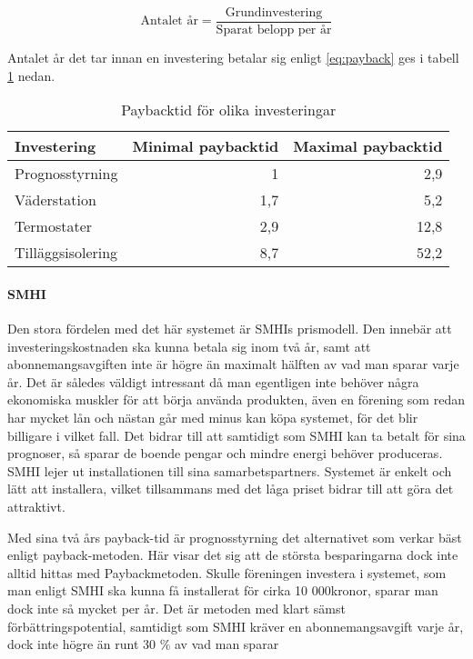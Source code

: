 \begin{equation} \label{eq:payback}
\text{Antalet år}=\frac{\text{Grundinvestering}}{\text{Sparat belopp per år}}
\end{equation}

Antalet år det tar innan en investering betalar sig enligt \eqref{eq:payback} ges i tabell \ref{tbl:payback} nedan.

\begin{table}[hbtp]
\centering
\caption{Paybacktid för olika investeringar}
\label{tbl:payback}

\begin{tabular}
{|l|r|r|}
\hline
\textbf{Investering} & \textbf{Minimal paybacktid} &{\textbf{Maximal paybacktid}} \\
\hline
Prognosstyrning &  1 & 2,9 \\ 
\hline
Väderstation & 1,7 & 5,2 \\
\hline
Termostater & 2,9 & 12,8 \\
\hline
Tilläggsisolering & 8,7 & 52,2 \\
\hline
\end{tabular}
\end{table}

\paragraph{SMHI}
Den stora fördelen med det här systemet är SMHIs prismodell. Den innebär att investeringskostnaden ska kunna betala sig inom två år, samt att abonnemangsavgiften inte är högre än maximalt hälften av vad man sparar varje år. Det är således väldigt intressant då man egentligen inte behöver några ekonomiska muskler för att börja använda produkten, även en förening som redan har mycket lån och nästan går med minus kan köpa systemet, för det blir billigare i vilket fall. Det bidrar till att samtidigt som SMHI kan ta betalt för sina prognoser, så sparar de boende pengar och mindre energi behöver produceras. SMHI lejer ut installationen till sina samarbetspartners. Systemet är enkelt och lätt att installera, vilket tillsammans med det låga priset bidrar till att göra det attraktivt.

Med sina två års payback-tid är prognosstyrning det alternativet som verkar bäst enligt payback-metoden. Här visar det sig att de största besparingarna dock inte alltid hittas med Paybackmetoden. Skulle föreningen investera i systemet, som man enligt SMHI ska kunna få installerat för cirka 10 000kronor, sparar man dock inte så mycket per år. Det är metoden med klart sämst förbättringspotential, samtidigt som SMHI kräver en abonnemangsavgift varje år, dock inte högre än runt 30 \% av vad man sparar


